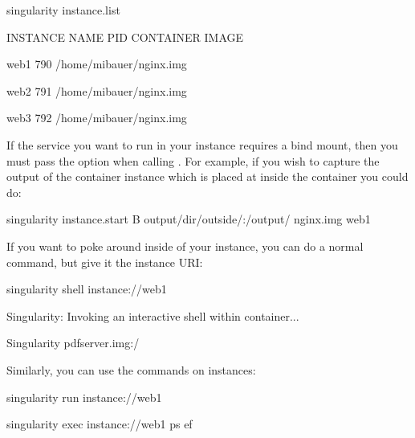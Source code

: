\documentclass[letterpaper,10pt,english]{sphinxmanual}
\begin{document}
%
\begin{sphinxVerbatim}[commandchars=\\\{\}]
\PYGZdl{} singularity instance.list

INSTANCE NAME    PID      CONTAINER IMAGE

web1             790      /home/mibauer/nginx.img

web2             791      /home/mibauer/nginx.img

web3             792      /home/mibauer/nginx.img
\end{sphinxVerbatim}

If the service you want to run in your instance requires a bind mount,
then you must pass the  option when calling . For example, if you wish to
capture the output of the  container instance which is placed at  inside
the container you could do:

%
\begin{sphinxVerbatim}[commandchars=\\\{\}]
\PYGZdl{} singularity instance.start \PYGZhy{}B output/dir/outside/:/output/ nginx.img  web1
\end{sphinxVerbatim}

If you want to poke around inside of your instance, you can do a normal 
command, but give it the instance URI:

%
\begin{sphinxVerbatim}[commandchars=\\\{\}]
\PYGZdl{} singularity shell instance://web1

Singularity: Invoking an interactive shell within container...


Singularity pdf\PYGZus{}server.img:\PYGZti{}/\PYGZgt{}
\end{sphinxVerbatim}

Similarly, you can use the  commands on instances:

%
\begin{sphinxVerbatim}[commandchars=\\\{\}]
\PYGZdl{} singularity run instance://web1

\PYGZdl{} singularity exec instance://web1 ps \PYGZhy{}ef
\end{sphinxVerbatim}
\end{document}
